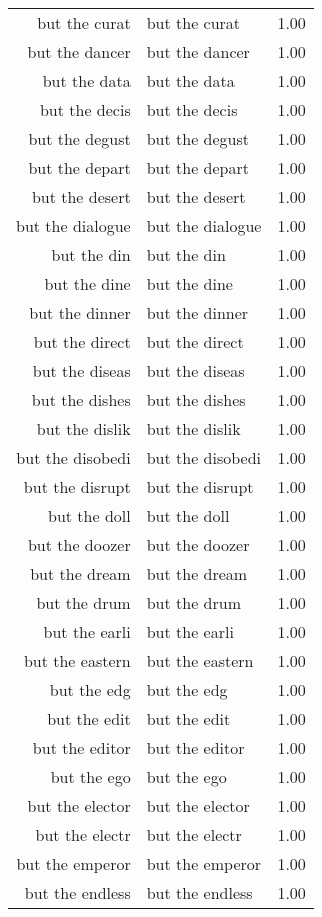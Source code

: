 \begin{table}[ht]
\begin{tabular}{rlr}
  but the curat & but the curat & 1.00 \\ 
  but the dancer & but the dancer & 1.00 \\ 
  but the data & but the data & 1.00 \\ 
  but the decis & but the decis & 1.00 \\ 
  but the degust & but the degust & 1.00 \\ 
  but the depart & but the depart & 1.00 \\ 
  but the desert & but the desert & 1.00 \\ 
  but the dialogue & but the dialogue & 1.00 \\ 
  but the din & but the din & 1.00 \\ 
  but the dine & but the dine & 1.00 \\ 
  but the dinner & but the dinner & 1.00 \\ 
  but the direct & but the direct & 1.00 \\ 
  but the diseas & but the diseas & 1.00 \\ 
  but the dishes & but the dishes & 1.00 \\ 
  but the dislik & but the dislik & 1.00 \\ 
  but the disobedi & but the disobedi & 1.00 \\ 
  but the disrupt & but the disrupt & 1.00 \\ 
  but the doll & but the doll & 1.00 \\ 
  but the doozer & but the doozer & 1.00 \\ 
  but the dream & but the dream & 1.00 \\ 
  but the drum & but the drum & 1.00 \\ 
  but the earli & but the earli & 1.00 \\ 
  but the eastern & but the eastern & 1.00 \\ 
  but the edg & but the edg & 1.00 \\ 
  but the edit & but the edit & 1.00 \\ 
  but the editor & but the editor & 1.00 \\ 
  but the ego & but the ego & 1.00 \\ 
  but the elector & but the elector & 1.00 \\ 
  but the electr & but the electr & 1.00 \\ 
  but the emperor & but the emperor & 1.00 \\ 
  but the endless & but the endless & 1.00 \\ 

\end{tabular}
\end{table}
